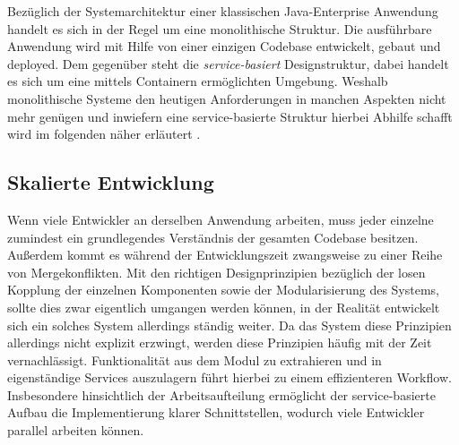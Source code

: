 



Bezüglich der Systemarchitektur einer klassischen Java-Enterprise Anwendung handelt es sich in der Regel um eine monolithische Struktur. Die ausführbare Anwendung wird mit Hilfe von einer einzigen Codebase entwickelt, gebaut und deployed. Dem gegenüber steht die \emph{service-basiert} Designstruktur, dabei handelt es sich um eine mittels Containern ermöglichten Umgebung. Weshalb monolithische Systeme den heutigen Anforderungen in manchen Aspekten nicht mehr genügen und inwiefern eine service-basierte Struktur hierbei Abhilfe schafft wird im folgenden näher erläutert \cite[Seite~42 ff.]{continuous-delivery}.


\subsection{Skalierte Entwicklung \checkmark \checkmark}
Wenn viele Entwickler an derselben Anwendung arbeiten, muss jeder einzelne zumindest ein grundlegendes Verständnis der gesamten Codebase besitzen. Außerdem kommt es während der Entwicklungszeit zwangsweise zu einer Reihe von Mergekonflikten. Mit den richtigen Designprinzipien bezüglich der losen Kopplung der einzelnen Komponenten sowie der Modularisierung des Systems, sollte dies zwar eigentlich umgangen werden können, in der Realität entwickelt sich ein solches System allerdings ständig weiter. Da das System diese Prinzipien allerdings nicht explizit erzwingt, werden diese Prinzipien häufig mit der Zeit vernachlässigt. Funktionalität aus dem Modul zu extrahieren und in eigenständige Services auszulagern führt hierbei zu einem effizienteren Workflow. Insbesondere hinsichtlich der Arbeitsaufteilung ermöglicht der service-basierte Aufbau die Implementierung klarer Schnittstellen, wodurch viele Entwickler parallel arbeiten können.


